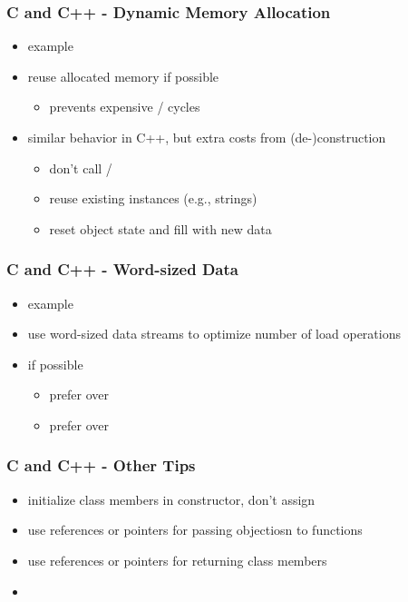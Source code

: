 \begin{frame}
 \frametitle{C and C++ - Dynamic Memory Allocation}
 \begin{itemize}
  \item example 
  \item reuse allocated memory if possible
  \begin{itemize}
   \item prevents expensive / cycles
  \end{itemize}
 \item similar behavior in C++, but extra costs from (de-)construction
  \begin{itemize}
   \item don't call /
   \item reuse existing instances (e.g., strings)
   \item reset object state and fill with new data
  \end{itemize}
 \end{itemize}
\end{frame}

\begin{frame}
 \frametitle{C and C++ - Word-sized Data}
 \begin{itemize}
  \item example 
  \item use word-sized data streams to optimize number of load operations
  \item if possible
  \begin{itemize}
   \item prefer  over 
   \item prefer  over 
  \end{itemize}
 \end{itemize}
\end{frame}

\begin{frame}
 \frametitle{C and C++ - Other Tips}
 \begin{itemize}
  \item initialize class members in constructor, don't assign
  \item use references or pointers for passing objectiosn to functions
  \item use references or pointers for returning class members
 \end{itemize}
 \begin{itemize}
  \item {}
 \end{itemize}
\end{frame}


